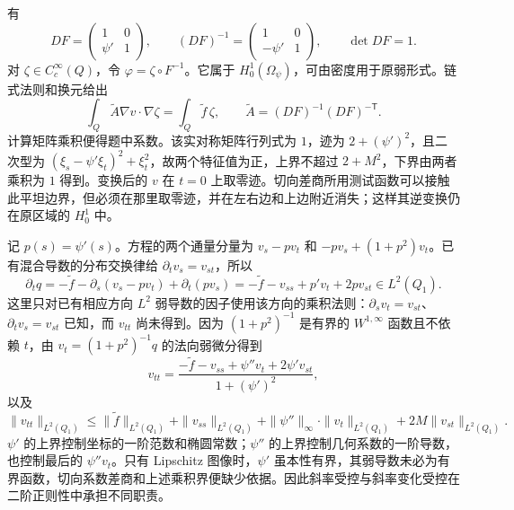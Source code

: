 \begin{solution}
有
\[
 DF=\begin{pmatrix}1&0\\\psi'&1\end{pmatrix},\qquad
 (DF)^{-1}=\begin{pmatrix}1&0\\-\psi'&1\end{pmatrix},\qquad \det DF=1.
\]
对 \(\zeta\in C_c^\infty(Q)\)，令 \(\varphi=\zeta\circ F^{-1}\)。它属于 \(H_0^1(\Omega_\psi)\)，可由密度用于原弱形式。链式法则和换元给出
\[
 \int_Q\widetilde A\nabla v\cdot\nabla\zeta
 =\int_Q\widetilde f\,\zeta,\qquad
 \widetilde A=(DF)^{-1}(DF)^{-\mathsf T}.
\]
计算矩阵乘积便得题中系数。该实对称矩阵行列式为 \(1\)，迹为 \(2+(\psi')^2\)，且二次型为 \((\xi_s-\psi'\xi_t)^2+\xi_t^2\)，故两个特征值为正，上界不超过 \(2+M^2\)，下界由两者乘积为 \(1\) 得到。变换后的 \(v\) 在 \(t=0\) 上取零迹。切向差商所用测试函数可以接触此平坦边界，但必须在那里取零迹，并在左右边和上边附近消失；这样其逆变换仍在原区域的 \(H_0^1\) 中。

记 \(p(s)=\psi'(s)\)。方程的两个通量分量为 \(v_s-pv_t\) 和 \(-pv_s+(1+p^2)v_t\)。已有混合导数的分布交换律给 \(\partial_tv_s=v_{st}\)，所以
\[
 \partial_tq
 =-\widetilde f-\partial_s(v_s-pv_t)+\partial_t(pv_s)
 =-\widetilde f-v_{ss}+p'v_t+2pv_{st}\in L^2(Q_1).
\]
这里只对已有相应方向 \(L^2\) 弱导数的因子使用该方向的乘积法则：\(\partial_sv_t=v_{st}\)、\(\partial_tv_s=v_{st}\) 已知，而 \(v_{tt}\) 尚未得到。因为 \((1+p^2)^{-1}\) 是有界的 \(W^{1,\infty}\) 函数且不依赖 \(t\)，由 \(v_t=(1+p^2)^{-1}q\) 的法向弱微分得到
\[
 v_{tt}=\frac{-\widetilde f-v_{ss}+\psi''v_t+2\psi'v_{st}}{1+(\psi')^2},
\]
以及
\[
 \|v_{tt}\|_{L^2(Q_1)}\le
 \|\widetilde f\|_{L^2(Q_1)}+\|v_{ss}\|_{L^2(Q_1)}
 +\|\psi''\|_\infty\cdot\|v_t\|_{L^2(Q_1)}+2M\|v_{st}\|_{L^2(Q_1)}.
\]
\(\psi'\) 的上界控制坐标的一阶范数和椭圆常数；\(\psi''\) 的上界控制几何系数的一阶导数，也控制最后的 \(\psi''v_t\)。只有 Lipschitz 图像时，\(\psi'\) 虽本性有界，其弱导数未必为有界函数，切向系数差商和上述乘积界便缺少依据。因此斜率受控与斜率变化受控在二阶正则性中承担不同职责。
\end{solution}
